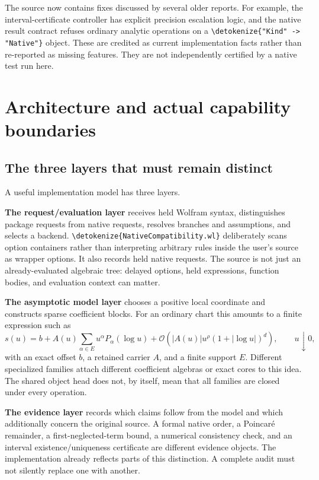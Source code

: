 \documentclass[11pt,a4paper]{article}
\newcommand{\wl}[1]{\texttt{\expandafter\nolinkurl\expandafter{\detokenize{#1}}}}
\newcommand{\OO}{\mathcal{O}}
\begin{document}
The source now contains fixes discussed by several older reports. For example,
the interval-certificate controller has explicit precision escalation logic,
and the native result contract refuses ordinary analytic operations on a
\wl{"Kind" -> "Native"} object. These are credited as current implementation
facts rather than re-reported as missing features. They are not independently
certified by a native test run here.\cite{cert,native,status}

\section{Architecture and actual capability boundaries}

\subsection{The three layers that must remain distinct}

A useful implementation model has three layers.

\textbf{The request/evaluation layer} receives held Wolfram syntax, distinguishes
package requests from native requests, resolves branches and assumptions, and
selects a backend. \wl{NativeCompatibility.wl} deliberately scans option
containers rather than interpreting arbitrary rules inside the user's source as
wrapper options. It also records held native requests. The source is not just an
already-evaluated algebraic tree: delayed options, held expressions, function
bodies, and evaluation context can matter.\cite{native,inverseexpr}

\textbf{The asymptotic model layer} chooses a positive local coordinate and
constructs sparse coefficient blocks. For an ordinary chart this amounts to a
finite expression such as
\begin{equation}\label{eq:ordinarymodel}
 s(u)=b+A(u)\sum_{\alpha\in E}u^\alpha P_\alpha(\log u)
      +\OO\!\left(|A(u)|u^\rho(1+|\log u|)^d\right),
 \qquad u\downarrow0,
\end{equation}
with an exact offset $b$, a retained carrier $A$, and a finite support $E$.
Different specialized families attach different coefficient algebras or exact
cores to this idea. The shared object head does not, by itself, mean that all
families are closed under every operation.\cite{core,arith,gamma,nativespecial}

\textbf{The evidence layer} records which claims follow from the model and
which additionally concern the original source. A formal native order, a
Poincar\'e remainder, a first-neglected-term bound, a numerical consistency check,
and an interval existence/uniqueness certificate are different evidence objects.
The implementation already reflects parts of this distinction. A complete audit
must not silently replace one with another.\cite{native,dirichlet,special,cert}
\end{document}
